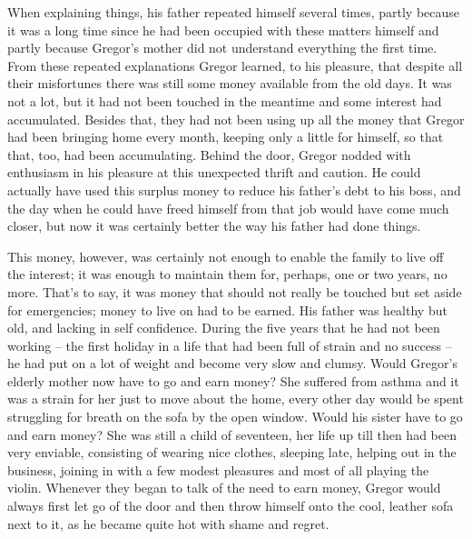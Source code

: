 When explaining things, his father repeated himself several times,
partly because it was a long time since he had been occupied with these
matters himself and partly because Gregor’s mother did not understand
everything the first time. From these repeated explanations Gregor
learned, to his pleasure, that despite all their misfortunes there was
still some money available from the old days. It was not a lot, but it
had not been touched in the meantime and some interest had accumulated.
Besides that, they had not been using up all the money that Gregor had
been bringing home every month, keeping only a little for himself, so
that that, too, had been accumulating. Behind the door, Gregor nodded
with enthusiasm in his pleasure at this unexpected thrift and caution.
He could actually have used this surplus money to reduce his father’s
debt to his boss, and the day when he could have freed himself from
that job would have come much closer, but now it was certainly better
the way his father had done things.

This money, however, was certainly not enough to enable the family to
live off the interest; it was enough to maintain them for, perhaps, one
or two years, no more. That’s to say, it was money that should not
really be touched but set aside for emergencies; money to live on had
to be earned. His father was healthy but old, and lacking in self
confidence. During the five years that he had not been working – the
first holiday in a life that had been full of strain and no success – he
had put on a lot of weight and become very slow and clumsy. Would
Gregor’s elderly mother now have to go and earn money? She suffered
from asthma and it was a strain for her just to move about the home,
every other day would be spent struggling for breath on the sofa by the
open window. Would his sister have to go and earn money? She was still
a child of seventeen, her life up till then had been very enviable,
consisting of wearing nice clothes, sleeping late, helping out in the
business, joining in with a few modest pleasures and most of all
playing the violin. Whenever they began to talk of the need to earn
money, Gregor would always first let go of the door and then throw
himself onto the cool, leather sofa next to it, as he became quite hot
with shame and regret.

